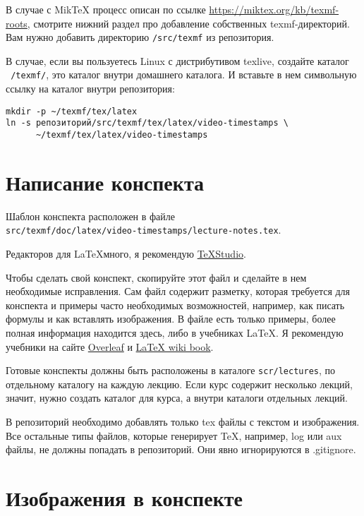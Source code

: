 \documentclass{article}
\begin{document}
    В случае с MikTeX процесс описан по ссылке \url{https://miktex.org/kb/texmf-roots}, смотрите нижний раздел про
    добавление собственных texmf-директорий.
    Вам нужно добавить директорию \texttt{/src/texmf} из репозитория.

    В случае, если вы пользуетесь Linux с дистрибутивом texlive, создайте каталог \texttt{~/texmf/}, это каталог внутри
    домашнего каталога. И вставьте в нем символьную ссылку на каталог внутри репозитория:

    \begin{verbatim}
mkdir -p ~/texmf/tex/latex
ln -s репозиторий/src/texmf/tex/latex/video-timestamps \
      ~/texmf/tex/latex/video-timestamps
    \end{verbatim}


    \section{Написание конспекта}

    Шаблон конспекта расположен в файле \\ \texttt{src/texmf/doc/latex/video-timestamps/lecture-notes.tex}.

    Редакторов для \LaTeX много, я рекомендую \href{https://www.texstudio.org/}{TeXStudio}.

    Чтобы сделать свой конспект, скопируйте этот файл и сделайте в нем необходимые исправления. Сам файл
    содержит разметку, которая требуется для конспекта и примеры часто необходимых возможностей, например,
    как писать формулы и как вставлять изображения. В файле есть только примеры, более полная информация
    находится здесь, либо в учебниках \LaTeX. Я рекомендую учебники на сайте
    \href{https://www.overleaf.com/learn}{Overleaf} и \href{https://en.wikibooks.org/wiki/LaTeX}{LaTeX wiki book}.

    Готовые конспекты должны быть расположены в каталоге \texttt{scr/lectures}, по отдельному каталогу
    на каждую лекцию. Если курс содержит несколько лекций, значит, нужно создать каталог для курса, а внутри
    каталоги отдельных лекций.

    В репозиторий необходимо добавлять только tex файлы с текстом и изображения. Все остальные типы файлов, которые
    генерирует TeX, например, log или aux файлы, не должны попадать в репозиторий. Они явно игнорируются в .gitignore.


    \section{Изображения в конспекте}
\end{document}
